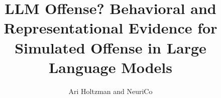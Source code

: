 \documentclass{article}
\title{LLM Offense? Behavioral and Representational Evidence for Simulated Offense in Large Language Models}
\author{Ari Holtzman and NeuriCo}
\begin{document}
\maketitle

\begin{abstract}

\end{abstract}










\end{document}
